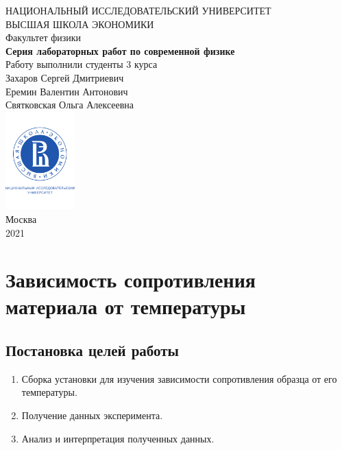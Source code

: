 \documentclass[a4paper, 12pt]{article}
\begin{document}
	\begin{titlepage}
		\begin{center}
			$$$$
			$$$$
			$$$$
			$$$$
			{\Large{НАЦИОНАЛЬНЫЙ ИССЛЕДОВАТЕЛЬСКИЙ УНИВЕРСИТЕТ}}\\
			\vspace{0.1cm}
			{\Large{ВЫСШАЯ ШКОЛА ЭКОНОМИКИ}}\\
			\vspace{0.25cm}
			{\large{Факультет физики}}\\
			\vspace{5.5cm}
			{\Huge\textbf{{Серия лабораторных работ по современной физике}}}\\%
			\vspace{1cm}
			{Работу выполнили студенты 3 курса}\\
			{Захаров Сергей Дмитриевич}\\
			{Еремин Валентин Антонович}\\
			{Святковская Ольга Алексеевна}\\
			\vfill
			\includegraphics[width = 0.2\textwidth]{HSElogo}\\
			\vfill
			Москва\\
			2021
		\end{center}
	\end{titlepage}
	
\tableofcontents

\newpage

\section{Зависимость сопротивления материала от температуры}

\subsection{Постановка целей работы}

\begin{enumerate}
	\item Сборка установки для изучения зависимости сопротивления образца от его температуры.
	
	\item Получение данных эксперимента.
	
	\item Анализ и интерпретация полученных данных.
\end{enumerate}
\end{document}
